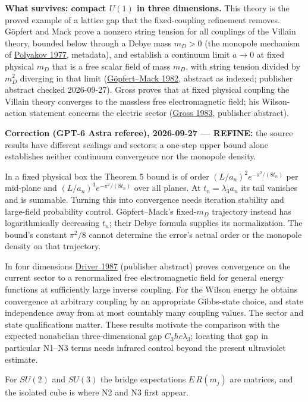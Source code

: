 \documentclass[11pt,a4paper]{article}
\begin{document}
\textbf{What survives: compact \(U(1)\) in three dimensions.} This
theory is the proved example of a lattice gap that the fixed-coupling
refinement removes. Göpfert and Mack prove a nonzero string tension for
all couplings of the Villain theory, bounded below through a Debye mass
\(m_D>0\) (the monopole mechanism of
\href{https://doi.org/10.1016/0550-3213(77)90086-4}{Polyakov 1977},
metadata), and establish a continuum limit \(a\to0\) at fixed physical
\(m_D\) that is a free scalar field of mass \(m_D\), with string tension
divided by \(m_D^2\) diverging in that limit
(\href{https://doi.org/10.1007/BF01961240}{Göpfert--Mack 1982}, abstract
as indexed; publisher abstract checked 2026-09-27). Gross proves that at
fixed physical coupling the Villain theory converges to the massless
free electromagnetic field; his Wilson-action statement concerns the
electric sector (\href{https://doi.org/10.1007/BF01210842}{Gross 1983},
publisher abstract).

\textbf{Correction (GPT-6 Astra referee), 2026-09-27 --- REFINE:} the
source results have different scalings and sectors; a one-step upper
bound alone establishes neither continuum convergence nor the monopole
density.

In a fixed physical box the Theorem 5 bound is of order
\((L/a_n)^2e^{-\pi^2/(8t_n)}\) per mid-plane and
\((L/a_n)^3e^{-\pi^2/(8t_n)}\) over all planes. At \(t_n=\lambda_3a_n\)
its tail vanishes and is summable. Turning this into convergence needs
iteration stability and large-field probability control. Göpfert--Mack's
fixed-\(m_D\) trajectory instead has logarithmically decreasing \(t_n\);
their Debye formula supplies its normalization. The bound's constant
\(\pi^2/8\) cannot determine the error's actual order or the monopole
density on that trajectory.

In four dimensions \href{https://doi.org/10.1007/BF01212424}{Driver
1987} (publisher abstract) proves convergence on the current sector to a
renormalized free electromagnetic field for general energy functions at
sufficiently large inverse coupling. For the Wilson energy he obtains
convergence at arbitrary coupling by an appropriate Gibbs-state choice,
and state independence away from at most countably many coupling values.
The sector and state qualifications matter. These results motivate the
comparison with the expected nonabelian three-dimensional gap
\(C_3\hbar c\lambda_3\); locating that gap in particular N1--N3 terms
needs infrared control beyond the present ultraviolet estimate.

For \(SU(2)\) and \(SU(3)\) the bridge expectations \(E\,R(m_j)\) are
matrices, and the isolated cube is where N2 and N3 first appear.
\end{document}
